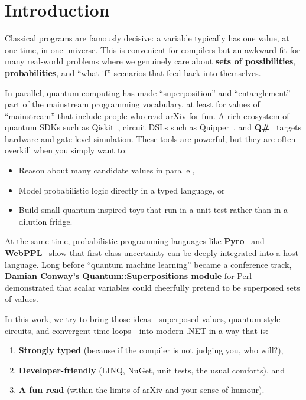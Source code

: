 \documentclass[a4paper,11pt]{article}
\begin{document}
\section{Introduction}

Classical programs are famously decisive: a variable typically has one value, at one time, in one universe. This is convenient for compilers but an awkward fit for many real-world problems where we genuinely care about \textbf{sets of possibilities}, \textbf{probabilities}, and ``what if'' scenarios that feed back into themselves.

In parallel, quantum computing has made ``superposition'' and ``entanglement'' part of the mainstream programming vocabulary, at least for values of ``mainstream'' that include people who read arXiv for fun. A rich ecosystem of quantum SDKs such as Qiskit~\parencite{pyp25}, circuit DSLs such as Quipper~\parencite{Green13Quipper}, and \textbf{Q\#}~\parencite{Mic25,Heim18QSharp} targets hardware and gate-level simulation. These tools are powerful, but they are often overkill when you simply want to:

\begin{itemize}
\item
Reason about many candidate values in parallel,
\item
Model probabilistic logic directly in a typed language, or
\item
Build small quantum-inspired toys that run in a unit test rather than in a dilution fridge.
\end{itemize}

At the same time, probabilistic programming languages like \textbf{Pyro}~\parencite{Goo19} and \textbf{WebPPL}~\parencite{Goodman14WebPPL} show that first-class uncertainty can be deeply integrated into a host language. Long before ``quantum machine learning'' became a conference track, \textbf{Damian Conway's Quantum::Superpositions module}\parencite{Dam25} for Perl demonstrated that scalar variables could cheerfully pretend to be superposed sets of values.

In this work, we try to bring those ideas - superposed values, quantum-style circuits, and convergent time loops - into modern .NET in a way that is:

\begin{enumerate}
\def\labelenumi{\arabic{enumi}.}
\item
\textbf{Strongly typed} (because if the compiler is not judging you, who will?),
\item
\textbf{Developer-friendly} (LINQ, NuGet, unit tests, the usual comforts), and
\item
\textbf{A fun read} (within the limits of arXiv and your sense of humour).
\end{enumerate}
\end{document}
